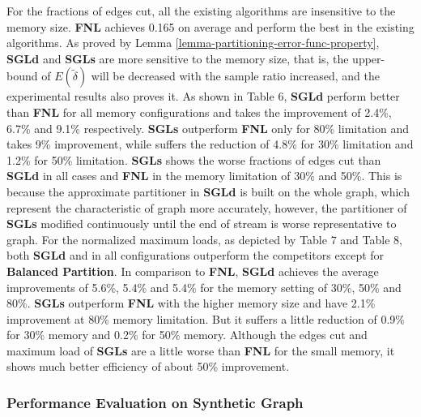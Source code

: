 \documentclass{sig-alternate-2013}
\begin{document}
For the fractions of edges cut, all the existing algorithms are insensitive to the memory size. \textbf{FNL} achieves 0.165 on average and perform the best in the existing algorithms. As proved by Lemma \ref{lemma-partitioning-error-func-property}, \textbf{SGLd} and \textbf{SGLs} are more sensitive to the memory size, that is, the upper-bound of $E(\tilde\delta)$ will be decreased with the sample ratio increased, and the experimental results also proves it. As shown in Table 6, \textbf{SGLd} perform better than \textbf{FNL} for all memory configurations and takes the improvement of 2.4\%, 6.7\% and 9.1\% respectively. \textbf{SGLs} outperform \textbf{FNL} only for 80\% limitation and takes 9\% improvement, while suffers the reduction of 4.8\% for 30\% limitation and 1.2\% for 50\% limitation. \textbf{SGLs} shows the worse fractions of edges cut than \textbf{SGLd} in all cases and \textbf{FNL} in the memory limitation of 30\% and 50\%. This is because the approximate partitioner in \textbf{SGLd} is built on the whole graph, which represent the characteristic of graph more accurately, however, the partitioner of \textbf{SGLs} modified continuously until the end of stream is worse representative to graph.
For the normalized maximum loads, as depicted by Table 7 and Table 8, both \textbf{SGLd} and in all configurations outperform the competitors except for \textbf{Balanced Partition}. In comparison to \textbf{FNL}, \textbf{SGLd} achieves the average improvements of 5.6\%, 5.4\% and 5.4\% for the memory setting of 30\%, 50\% and 80\%. \textbf{SGLs} outperform \textbf{FNL} with the higher memory size and have 2.1\% improvement at 80\% memory limitation. But it suffers a little reduction of 0.9\% for 30\% memory and 0.2\% for 50\% memory.
Although the edges cut and maximum load of \textbf{SGLs} are a little worse than \textbf{FNL} for the small memory, it shows much better efficiency of about 50\% improvement.

\subsubsection{Performance Evaluation on Synthetic Graph}
\end{document}
